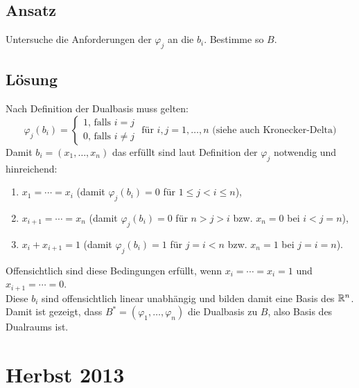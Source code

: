 \subsection{Ansatz}
Untersuche die Anforderungen der \( \varphi_j \) an die \( b_i \). Bestimme so \( B \).

\subsection{Lösung}
Nach Definition der Dualbasis muss gelten:
\begin{equation*}
	\varphi_j(b_i) = \begin{cases}
		1 \text{, falls } i = j \\
		0 \text{, falls } i \neq j
	\end{cases} \text{ für } i,j = 1, \dots, n \text{ (siehe auch Kronecker-Delta)}
\end{equation*}
Damit \( b_i = (x_1, \dots, x_n) \) das erfüllt sind laut Definition der \( \varphi_j \) notwendig und hinreichend:
\begin{enumerate}
	\item \( x_1 = \cdots = x_i \) (damit \( \varphi_j(b_i) = 0 \) für \( 1 \leq j < i \leq n \)),
	\item \( x_{i+1} = \cdots = x_n \) (damit \( \varphi_j(b_i) = 0 \) für \( n > j > i \) bzw. \( x_n = 0 \) bei \( i < j = n \)),
	\item \( x_i + x_{i+1} = 1 \) (damit \( \varphi_j(b_i) = 1 \) für \( j=i < n \) bzw. \( x_n = 1 \) bei \( j=i=n \)).
\end{enumerate}
Offensichtlich sind diese Bedingungen erfüllt, wenn \( x_i = \cdots = x_i = 1 \) und \( x_{i+1} = \cdots = 0 \).
\\
Diese \( b_i \) sind offensichtlich linear unabhängig und bilden damit eine Basis des \( \mathbb{R}^n \). Damit ist gezeigt, dass \( B^\ast = (\varphi_1, \dots, \varphi_n) \) die Dualbasis zu \( B \), also Basis des Dualraums ist.

\newpage


\section{Herbst 2013}

